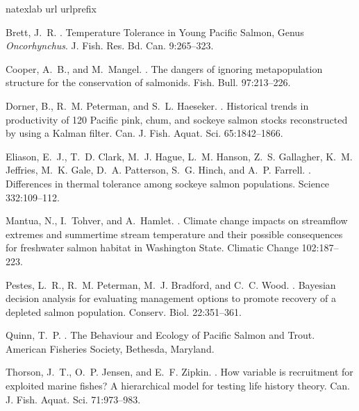\documentclass[12pt]{article}
\begin{document}
%
%
\begin{thebibliography}{8}
\expandafter\ifx\csname natexlab\endcsname\relax\def\natexlab#1{#1}\fi
\expandafter\ifx\csname url\endcsname\relax
  \def\url#1{{\tt #1}}\fi
\expandafter\ifx\csname urlprefix\endcsname\relax\def\urlprefix{URL }\fi

Brett, J.~R.
.
\newblock Temperature Tolerance in Young Pacific Salmon, Genus
  \textit{Oncorhynchus}.
\newblock J. Fish. Res. Bd. Can. 9:265--323.

Cooper, A.~B., and M.~Mangel.
.
\newblock The dangers of ignoring metapopulation structure for the conservation
  of salmonids.
\newblock Fish. Bull. 97:213--226.

Dorner, B., R.~M. Peterman, and S.~L. Haeseker.
.
\newblock Historical trends in productivity of 120 {Pacific} pink, chum, and
  sockeye salmon stocks reconstructed by using a {Kalman} filter.
\newblock Can. J. Fish. Aquat. Sci. 65:1842--1866.

Eliason, E.~J., T.~D. Clark, M.~J. Hague, L.~M. Hanson, Z.~S. Gallagher, K.~M.
  Jeffries, M.~K. Gale, D.~A. Patterson, S.~G. Hinch, and A.~P. Farrell.
.
\newblock Differences in thermal tolerance among sockeye salmon populations.
\newblock Science 332:109--112.

Mantua, N., I.~Tohver, and A.~Hamlet.
.
\newblock Climate change impacts on streamflow extremes and summertime stream
  temperature and their possible consequences for freshwater salmon habitat in
  {Washington State}.
\newblock Climatic Change 102:187--223.

Pestes, L.~R., R.~M. Peterman, M.~J. Bradford, and C.~C. Wood.
.
\newblock Bayesian decision analysis for evaluating management options to
  promote recovery of a depleted salmon population.
\newblock Conserv. Biol. 22:351--361.

Quinn, T.~P.
.
\newblock The Behaviour and Ecology of Pacific Salmon and Trout.
\newblock American Fisheries Society, Bethesda, Maryland.

Thorson, J.~T., O.~P. Jensen, and E.~F. Zipkin.
.
\newblock How variable is recruitment for exploited marine fishes? A
  hierarchical model for testing life history theory.
\newblock Can. J. Fish. Aquat. Sci. 71:973--983.

\end{thebibliography}
\end{document}
